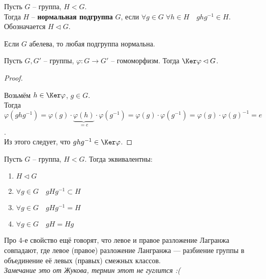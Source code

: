 \begin{conj}
    Пусть $G$ -- группа, $H < G$. \\Тогда $H$ --
    \textbf{нормальная подгруппа} $G$, если
    $\forall g \in G \; \forall h \in H \quad
    ghg^{-1} \in H$. \\
    Обозначается $H \lhd G$.
\end{conj}

\notice Если $G$ абелева, то любая подгруппа нормальна.

\begin{theorem-non}
    Пусть $G, G'$ -- группы, $\varphi \colon G \to G'$ -- гомоморфизм.
    Тогда $\Ker \varphi \lhd G$.
\end{theorem-non}
\begin{proof} $ $

    Возьмём $h \in \Ker \varphi$, $g \in G$.\\
    Тогда $\varphi(ghg^{-1}) = \varphi(g) \cdot 
    \underbrace{\varphi(h)}_{= e}
    \cdot \varphi(g^{-1}) =
    \varphi(g) \cdot \varphi(g^{-1}) =
    \varphi(g) \cdot \varphi(g)^{-1} = e$. \\
    Из этого следует, что $ghg^{-1} \in \Ker \varphi$.
\end{proof}

\begin{theorem-non}
    Пусть $G$ -- группа, $H < G$. Тогда эквивалентны:
    \begin{enumerate}
        \item $H \lhd G$
        \item $\forall g \in G \quad gHg^{-1} \subset H$
        \item $\forall g \in G \quad gHg^{-1} = H$
        \item $\forall g \in G \quad gH = Hg$
    \end{enumerate}
\end{theorem-non}
\notice Про 4-е свойство ещё говорят, что левое и правое
разложение Лагранжа совпадают, где левое (правое) разложение Лангранжа
--- разбиение группы в объединение её левых (правых) смежных классов.\\
\textit{Замечание это от Жукова, термин этот не гуглится :(}

